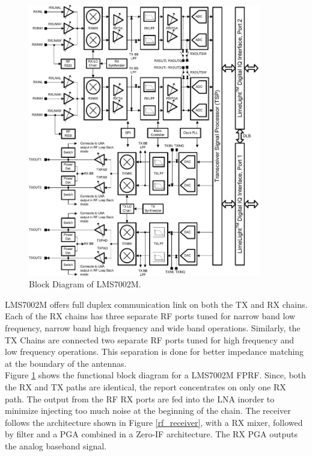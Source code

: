 \begin{figure}[h!]
\centering
\includegraphics[width=0.9\textwidth]{Figure/Lms7002m-block-diagram.png}
\caption{Block Diagram of LMS7002M.}
\label{lms7002m}
\end{figure}

LMS7002M offers full duplex communication link on both the TX and RX chains.
Each of the RX chains has three separate \ac{RF} ports tuned for narrow band low frequency, narrow band high frequency and wide band operations.
Similarly, the TX Chains are connected two separate \ac{RF} ports tuned for high frequency and low frequency operations.
This separation is done for better impedance matching at the boundary of the antennas.\\

Figure \ref{lms7002m} shows the functional block diagram for a LMS7002M \ac{FPRF}.
Since, both the RX and TX paths are identical, the report concentrates on only one RX path.
The output from the \ac{RF} RX ports are fed into the \ac{LNA} inorder to minimize injecting too much noise at the beginning of the chain.
The receiver follows the architecture shown in Figure \ref{rf_receiver}, with a RX mixer, followed by filter and a \ac{PGA} combined in a Zero-IF architecture.
The RX \ac{PGA} outputs the analog baseband signal.\\

